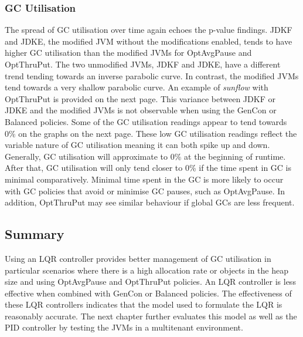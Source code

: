 \subsubsection{GC Utilisation}
The spread of GC utilisation over time again echoes the p-value
findings. JDKF and JDKE, the modified JVM without the modifications
enabled, tends to have higher GC utilisation than the modified
JVMs for OptAvgPause and OptThruPut. The two unmodified JVMs, JDKF and JDKE, have a
different trend tending towards an inverse parabolic curve. In contrast,
the modified JVMs tend towards a very shallow parabolic curve. An
example of \emph{sunflow} with OptThruPut is provided on the next page. This
variance between JDKF or JDKE and the modified JVMs is not observable when using the GenCon or Balanced policies.
\newline\newline
Some of the GC utilisation readings appear to tend towards 0\% on the graphs on the next page. These low GC utilisation readings reflect the variable nature of GC utilisation meaning it can both spike up and down. Generally, GC utilisation will approximate to 0\% at the beginning of runtime. After that, GC utilisation will only tend closer to 0\% if the time spent in GC is minimal comparatively. Minimal time spent in the GC is more likely to occur with GC policies that avoid or minimise GC pauses, such as OptAvgPause. In addition, OptThruPut may see similar behaviour if global GCs are less frequent.   

\subsection{Summary}
Using an LQR controller provides better management of GC utilisation in
particular scenarios where there is a high allocation rate or objects in
the heap size and using OptAvgPause and OptThruPut policies. An LQR
controller is less effective when combined with GenCon or Balanced
policies. The effectiveness of these LQR controllers indicates that the
model used to formulate the LQR is reasonably accurate. The next chapter
further evaluates this model as well as the PID controller by testing
the JVMs in a multitenant environment.

